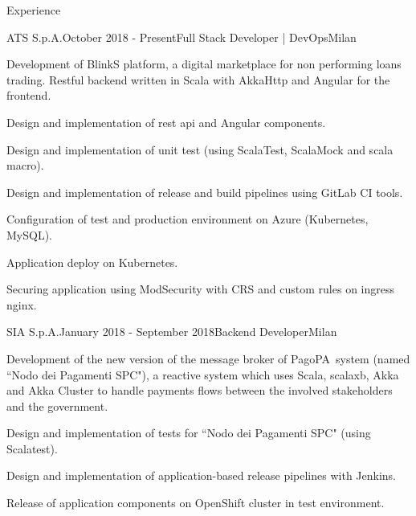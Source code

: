 \documentclass{resume} %
\begin{document}

\begin{rSection}{Experience}

\begin{rSubsection}{ATS S.p.A.}{October 2018 - Present}{Full Stack Developer | DevOps}{Milan}
\item Development of BlinkS platform, a digital marketplace for non performing loans trading.
Restful backend written in Scala with AkkaHttp and Angular for the frontend.
\item Design and implementation of rest api and Angular components.
\item Design and implementation of unit test (using ScalaTest, ScalaMock and scala macro).
\item Design and implementation of release and build pipelines using GitLab CI tools.
\item Configuration of test and production environment on Azure (Kubernetes, MySQL).
\item Application deploy on Kubernetes.
\item Securing application using ModSecurity with CRS and custom rules on ingress nginx.
\end{rSubsection}


\begin{rSubsection}{SIA S.p.A.}{January 2018 - September 2018}{Backend Developer}{Milan}
\item Development of the new version of the message broker of PagoPA\textregistered~system (named ``Nodo dei Pagamenti SPC"),
a reactive system which uses Scala, scalaxb, Akka and Akka Cluster to handle payments flows between the involved stakeholders and the government.
\item Design and implementation of tests for ``Nodo dei Pagamenti SPC" (using Scalatest).
\item Design and implementation of application-based release pipelines with Jenkins.
\item Release of application components on OpenShift cluster in test environment.
\end{rSubsection}



\end{rSection}
\end{document}
